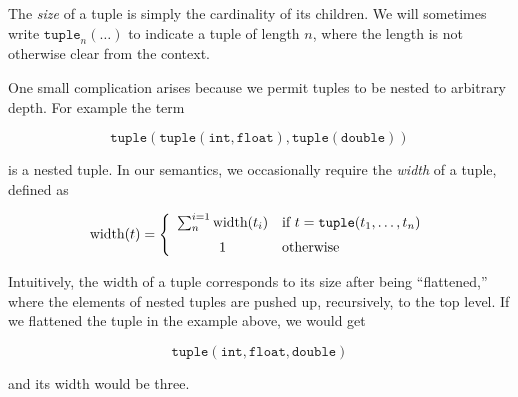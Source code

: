 The \emph{size} of a tuple is simply the cardinality of its
children. We will sometimes write $\mathtt{tuple}_n(\ldots)$ to
indicate a tuple of length $n$, where the length is not otherwise
clear from the context.

One small complication arises because we permit tuples to be nested to arbitrary depth. For example the term

\[
\mathtt{tuple(tuple(int,float),tuple(double))} 
\]

is a nested tuple. In our semantics, we occasionally require the
\emph{width} of a tuple, defined as

\[
\mbox{width}(t) = \left\{
  \begin{array}{cl}
    \sum^{i=1}_{n} \mbox{width}(t_i) 
      & \mbox{if } t = \mathtt{tuple}(t_1,\ldots,t_n)\vspace{2mm}\\
    1 & \mbox{otherwise}
  \end{array}
\right.
\]

Intuitively, the width of a tuple corresponds to its size after
being ``flattened,'' where the elements of nested tuples are
pushed up, recursively, to the top level. If we flattened the
tuple in the example above, we would get

\[
\mathtt{tuple(int,float,double)}
\]

and its width would be three.
